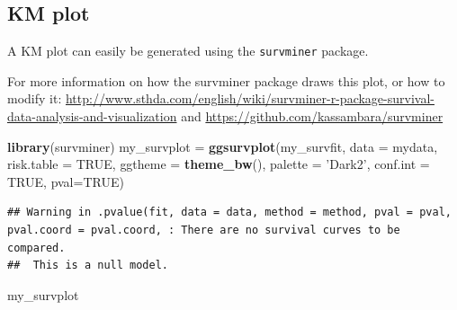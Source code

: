 \documentclass[]{book}
\makeatletter
\newenvironment{Shaded}{\begin{snugshade}}{\end{snugshade}}
\newcommand{\KeywordTok}[1]{\textcolor[rgb]{0.13,0.29,0.53}{\textbf{#1}}}
\newcommand{\DataTypeTok}[1]{\textcolor[rgb]{0.13,0.29,0.53}{#1}}
\newcommand{\StringTok}[1]{\textcolor[rgb]{0.31,0.60,0.02}{#1}}
\newcommand{\CommentTok}[1]{\textcolor[rgb]{0.56,0.35,0.01}{\textit{#1}}}
\newcommand{\OtherTok}[1]{\textcolor[rgb]{0.56,0.35,0.01}{#1}}
\newcommand{\NormalTok}[1]{#1}
\newenvironment{kframe}{%
\medskip{}
\setlength{\fboxsep}{.8em}
 \def\at@end@of@kframe{}%
 \ifinner\ifhmode%
  \def\at@end@of@kframe{\end{minipage}}%
  \begin{minipage}{\columnwidth}%
 \fi\fi%
 \def\FrameCommand##1{\hskip\@totalleftmargin \hskip-\fboxsep
 \colorbox{shadecolor}{##1}\hskip-\fboxsep
     \hskip-\linewidth \hskip-\@totalleftmargin \hskip\columnwidth}%
 \MakeFramed {\advance\hsize-\width
   \@totalleftmargin\z@ \linewidth\hsize
   \@setminipage}}%
 {\par\unskip\endMakeFramed%
 \at@end@of@kframe}
\renewenvironment{Shaded}{\begin{kframe}}{\end{kframe}}
\makeatother
\begin{document}
\begin{Shaded}
\end{Shaded}

\subsection{KM plot}\label{km-plot}

A KM plot can easily be generated using the \texttt{survminer} package.

For more information on how the survminer package draws this plot, or
how to modify it:
\url{http://www.sthda.com/english/wiki/survminer-r-package-survival-data-analysis-and-visualization}
and \url{https://github.com/kassambara/survminer}

\begin{Shaded}
\begin{Highlighting}[]
\KeywordTok{library}\NormalTok{(survminer)}
\NormalTok{my_survplot =}\StringTok{ }\KeywordTok{ggsurvplot}\NormalTok{(my_survfit, }\DataTypeTok{data =}\NormalTok{ mydata,                 }
           \DataTypeTok{risk.table =} \OtherTok{TRUE}\NormalTok{,}
           \DataTypeTok{ggtheme =} \KeywordTok{theme_bw}\NormalTok{(),}
           \DataTypeTok{palette =} \StringTok{'Dark2'}\NormalTok{,}
           \DataTypeTok{conf.int =} \OtherTok{TRUE}\NormalTok{,}
           \DataTypeTok{pval=}\OtherTok{TRUE}\NormalTok{)}
\end{Highlighting}
\end{Shaded}

\begin{verbatim}
## Warning in .pvalue(fit, data = data, method = method, pval = pval, pval.coord = pval.coord, : There are no survival curves to be compared. 
##  This is a null model.
\end{verbatim}

\begin{Shaded}
\begin{Highlighting}[]
\NormalTok{my_survplot}
\end{Highlighting}
\end{Shaded}
\end{document}

